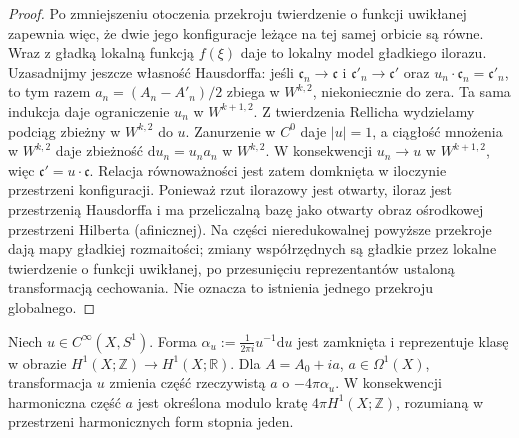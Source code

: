 \begin{proof}
Po zmniejszeniu otoczenia przekroju twierdzenie
o funkcji uwikłanej zapewnia więc, że dwie jego
konfiguracje leżące na tej samej orbicie są równe.
Wraz z gładką lokalną funkcją $f(\xi)$ daje to
lokalny model gładkiego ilorazu. Uzasadnijmy jeszcze
własność Hausdorffa: jeśli $\mathfrak c_n\to\mathfrak c$
i $\mathfrak c'_n\to\mathfrak c'$ oraz
$u_n\cdot\mathfrak c_n=\mathfrak c'_n$, to tym razem
$a_n=(A_n-A'_n)/2$ zbiega w $W^{k,2}$, niekoniecznie
do zera. Ta sama indukcja daje ograniczenie $u_n$
w $W^{k+1,2}$. Z twierdzenia Rellicha wydzielamy
podciąg zbieżny w $W^{k,2}$ do $u$.
Zanurzenie w $C^0$ daje $|u|=1$, a ciągłość
mnożenia w $W^{k,2}$ daje zbieżność
$\mathrm du_n=u_na_n$ w $W^{k,2}$.
W konsekwencji $u_n\to u$ w $W^{k+1,2}$,
więc $\mathfrak c'=u\cdot\mathfrak c$.
Relacja równoważności jest zatem domknięta
w iloczynie przestrzeni konfiguracji.
Ponieważ rzut ilorazowy jest otwarty, iloraz
jest przestrzenią Hausdorffa i ma przeliczalną
bazę jako otwarty obraz ośrodkowej przestrzeni
Hilberta (afinicznej). Na części nieredukowalnej
powyższe przekroje dają mapy gładkiej rozmaitości;
zmiany współrzędnych są gładkie przez lokalne
twierdzenie o funkcji uwikłanej, po przesunięciu
reprezentantów ustaloną transformacją cechowania.
Nie oznacza to istnienia jednego przekroju globalnego.
\end{proof}

\begin{stwierdzenie}
\label{prop:tg-sw12-lattice}
Niech $u\in C^\infty(X,S^1)$. Forma
$\alpha_u:=\frac{1}{2\pi i}u^{-1}\mathrm du$ jest zamknięta
i reprezentuje klasę w obrazie
$H^1(X;\mathbb Z)\to H^1(X;\mathbb R)$.
Dla $A=A_0+i a$, $a\in\Omega^1(X)$, transformacja $u$
zmienia część rzeczywistą $a$ o $-4\pi\alpha_u$.
W konsekwencji harmoniczna część $a$ jest określona
modulo kratę $4\pi H^1(X;\mathbb Z)$, rozumianą
w przestrzeni harmonicznych form stopnia jeden.
\end{stwierdzenie}

